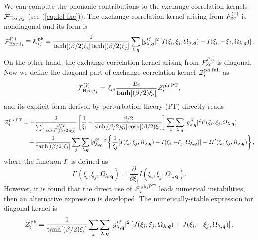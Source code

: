 We can compute the phononic contributions to the exchange-correlation kernels ${\mathcal F}_{{\rm Hxc},ij}$
(see (\ref{eq:def-fxc})).
The exchange-correlation kernel arising from $F^{(1)}_{\rm xc}$ is nondiagonal and its form is
%
\begin{equation}
	{\mathcal F}^{(1)}_{{\rm Hxc},ij}
	\equiv{\mathcal K}^{\rm ph}_{ij} = \frac{2}{\tanh[(\beta/2)\xi_i]\tanh[(\beta/2)\xi_j]}
	\sum_{\lambda, \bm q} |g^{ij}_{\lambda, \bm q}|^2
	\left[
		I(\xi_i, \xi_j, \Omega_{\lambda, \bm q}) - I(\xi_i, -\xi_j, \Omega_{\lambda, \bm q})
	\right].
	\label{eq:Kph}
\end{equation}
%
On the other hand, the exchange-correlation kernel arising from $F^{(2)}_{\rm xc}$ is diagonal.
Now we define the diagonal part of exchange-correlation kernel ${\mathcal Z}^{\rm ph, full}_i$ as
%
\begin{equation}
	{\mathcal F}^{(2)}_{{\rm Hxc},ij} = \delta_{ij}
	\frac{E_i}{\tanh[(\beta/2)\xi_i]}{\mathcal Z}^{\rm ph,PT}_i,
	\label{eq:FxcZphPT}
\end{equation}
and its explicit form derived by perturbation theory (PT) directly reads
%
\begin{equation}
\begin{split}
	\label{eq:ZphPT}
	{\mathcal Z}^{\rm ph, PT}_i &= - \frac{2}{\sum_{j} \frac{\beta/2}{\cosh^2[(\beta/2)\xi_j]}}
	\left[
		\frac{1}{\xi_i} - \frac{\beta/2}{\sinh[(\beta/2)\xi_i]\cosh[(\beta/2)\xi_i]}
	\right]
	\sum_{jl}\sum_{\lambda, \bm q} |g^{jl}_{\lambda, \bm q}|^2 I'(\xi_i, \xi_j, \Omega_{\lambda, \bm q}) \\
	&\quad + \frac{1}{\tanh[(\beta/2)\xi_i]}
	\sum_{j}\sum_{\lambda, \bm q} |g^{ij}_{\lambda, \bm q}|^2
	\left\{
		\frac{1}{\xi_j} [I(\xi_i, \xi_j, \Omega_{\lambda, \bm q}) - I(\xi_i, -\xi_j, \Omega_{\lambda, \bm q})]
		- 2I'(\xi_i, \xi_j, \Omega_{\lambda, \bm q})
	\right\},
\end{split}
\end{equation}
%
where the function $I'$ is defined as
%
\begin{equation}
	I'(\xi_i, \xi_j, \Omega_{\lambda, \bm q}) = 
	\frac{\partial}{\partial \xi_i} I(\xi_i, \xi_j, \Omega_{\lambda, \bm q}).
	\label{eq:Iprime}
\end{equation}
%
However, it is found that the direct use of ${\mathcal Z}^{\rm ph, PT}_i$ leads numerical instabilities\cite{Luders2005_1},
then an alternative expression is developed. The numerically-stable expression for diagonal kernel is 
%
\begin{equation}
	{\mathcal Z}^{\rm ph}_i = \frac{1}{\tanh[(\beta/2)\xi_i]}
	\sum_{j}\sum_{\lambda, \bm q} |g^{ij}_{\lambda, \bm q}|^2
	\left[
		J(\xi_i, \xi_j, \Omega_{\lambda, \bm q}) +
		J(\xi_i, -\xi_j, \Omega_{\lambda, \bm q})
	\right],
	\label{eq:Zphprac}
\end{equation}

